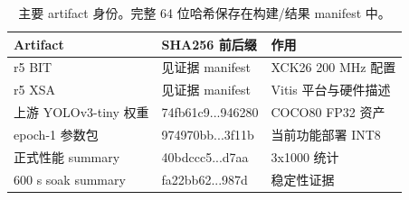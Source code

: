 \begin{table}[t]
\centering
\caption{主要 artifact 身份。完整 64 位哈希保存在构建/结果 manifest 中。}
\label{tab:artifact-id}
\small
\begin{tabular}{lll}
\toprule
Artifact & SHA256 前后缀 & 作用\\
\midrule
r5 BIT & 见证据 manifest & XCK26 200 MHz 配置 \\
r5 XSA & 见证据 manifest & Vitis 平台与硬件描述 \\
上游 YOLOv3-tiny 权重 & 74fb61c9...946280 & COCO80 FP32 资产 \\
epoch-1 参数包 & 974970bb...3f11b & 当前功能部署 INT8 \\
正式性能 summary & 40bdccc5...d7aa & 3x1000 统计 \\
600 s soak summary & fa22bb62...987d & 稳定性证据 \\
\bottomrule
\end{tabular}
\end{table}
